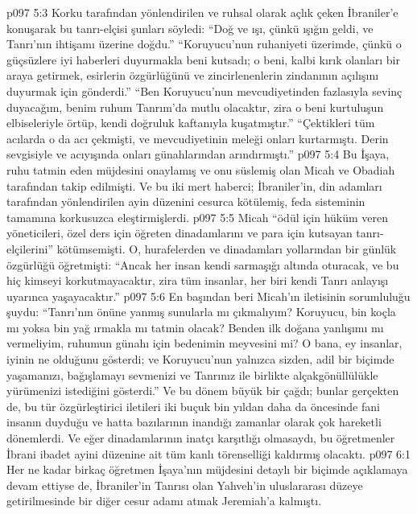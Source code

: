 \vs p097 5:3 Korku tarafından yönlendirilen ve ruhsal olarak açlık çeken İbraniler’e konuşarak bu tanrı\hyp{}elçisi şunları söyledi: “Doğ ve ışı, çünkü ışığın geldi, ve Tanrı’nın ihtişamı üzerine doğdu.” “Koruyucu’nun ruhaniyeti üzerimde, çünkü o güçsüzlere iyi haberleri duyurmakla beni kutsadı; o beni, kalbi kırık olanları bir araya getirmek, esirlerin özgürlüğünü ve zincirlenenlerin zindanının açılışını duyurmak için gönderdi.” “Ben Koruyucu’nun mevcudiyetinden fazlasıyla sevinç duyacağım, benim ruhum Tanrım’da mutlu olacaktır, zira o beni kurtuluşun elbiseleriyle örtüp, kendi doğruluk kaftanıyla kuşatmıştır.” “Çektikleri tüm acılarda o da acı çekmişti, ve mevcudiyetinin meleği onları kurtarmıştı. Derin sevgisiyle ve acıyışında onları günahlarından arındırmıştı.”
\vs p097 5:4 Bu İşaya, ruhu tatmin eden müjdesini onaylamış ve onu süslemiş olan Micah ve Obadiah tarafından takip edilmişti. Ve bu iki mert haberci; İbraniler’in, din adamları tarafından yönlendirilen ayin düzenini cesurca kötülemiş, feda sisteminin tamamına korkusuzca eleştirmişlerdi.
\vs p097 5:5 Micah “ödül için hüküm veren yöneticileri, özel ders için öğreten dinadamlarını ve para için kutsayan tanrı\hyp{}elçilerini” kötümsemişti. O, hurafelerden ve dinadamları yollarından bir günlük özgürlüğü öğretmişti: “Ancak her insan kendi sarmaşığı altında oturacak, ve bu hiç kimseyi korkutmayacaktır, zira tüm insanlar, her biri kendi Tanrı anlayışı uyarınca yaşayacaktır.”
\vs p097 5:6 En başından beri Micah’ın iletisinin sorumluluğu şuydu: “Tanrı’nın önüne yanmış sunularla mı çıkmalıyım? Koruyucu, bin koçla mı yoksa bin yağ ırmakla mı tatmin olacak? Benden ilk doğana yanlışımı mı vermeliyim, ruhumun günahı için bedenimin meyvesini mi? O bana, ey insanlar, iyinin ne olduğunu gösterdi; ve Koruyucu’nun yalnızca sizden, adil bir biçimde yaşamanızı, bağışlamayı sevmenizi ve Tanrınız ile birlikte alçakgönüllülükle yürümenizi istediğini gösterdi.” Ve bu dönem büyük bir çağdı; bunlar gerçekten de, bu tür özgürleştirici iletileri iki buçuk bin yıldan daha da öncesinde fani insanın duyduğu ve hatta bazılarının inandığı zamanlar olarak çok hareketli dönemlerdi. Ve eğer dinadamlarının inatçı karşıtlığı olmasaydı, bu öğretmenler İbrani ibadet ayini düzenine ait tüm kanlı törenselliği kaldırmış olacaktı.
\vs p097 6:1 Her ne kadar birkaç öğretmen İşaya’nın müjdesini detaylı bir biçimde açıklamaya devam ettiyse de, İbraniler’in Tanrısı olan Yahveh’in uluslararası düzeye getirilmesinde bir diğer cesur adamı atmak Jeremiah’a kalmıştı.
